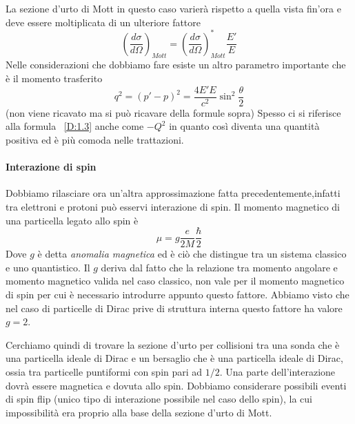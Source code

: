 La sezione d'urto di Mott in questo caso varierà rispetto a quella vista fin'ora e deve essere moltiplicata di un ulteriore fattore
\begin{equation}
\left(\frac{d\sigma}{d\Omega}\right)_{Mott}=\left(\frac{d\sigma}{d\Omega}\right)_{Mott}^*\frac{E'}{E}
\end{equation}
Nelle considerazioni che dobbiamo fare esiste un altro parametro importante che è il momento trasferito
\begin{equation}
q^2=(p'-p)^2=\frac{4E'E}{c^2}\sin^2\frac{\theta}{2}
\label{D:1.3}
\end{equation}
(non viene ricavato ma si può ricavare della formule sopra)
Spesso ci si riferisce alla formula ~\eqref{D:1.3} anche come $-Q^2$ in quanto così diventa una quantità positiva ed è più comoda nelle trattazioni.

\paragraph{Interazione di spin}
Dobbiamo rilasciare ora un'altra approssimazione fatta precedentemente,infatti tra elettroni e protoni può esservi interazione di spin.
Il momento magnetico di una particella legato allo spin è
\begin{equation}
\mu =g\frac{e}{2M}\frac{\hbar}{2}
\end{equation}
Dove $g$ è detta \emph{anomalia magnetica} ed è ciò che distingue tra  un sistema classico e uno quantistico.
Il $g$ deriva dal fatto che la relazione tra momento angolare e momento magnetico valida nel caso classico, non vale per il momento magnetico di spin per cui è necessario introdurre appunto questo fattore.
Abbiamo visto che nel caso di particelle di Dirac prive di struttura interna questo fattore ha valore $g=2$.

Cerchiamo quindi di trovare la sezione d'urto per collisioni tra una sonda che è una particella ideale di Dirac e un bersaglio che è una particella ideale di Dirac, ossia tra particelle puntiformi con spin pari ad $1/2$.
Una parte dell'interazione dovrà essere magnetica e dovuta allo spin.
Dobbiamo considerare possibili eventi di spin flip (unico tipo di interazione possibile nel caso dello spin), la cui impossibilità era proprio alla base della sezione d'urto di Mott.

